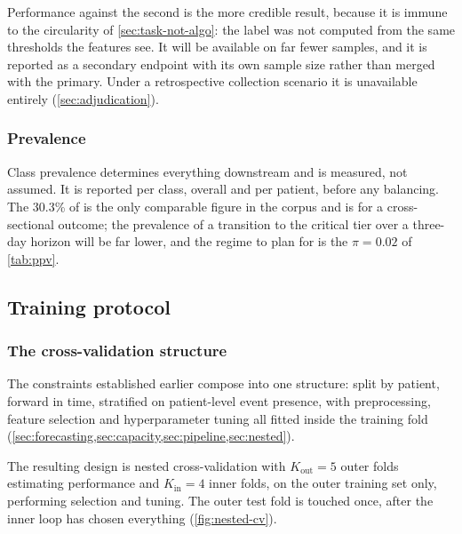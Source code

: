 \documentclass[12pt,a4paper,oneside]{report}
\begin{document}
Performance against the second is the more credible result, because it is immune to the circularity of \cref{sec:task-not-algo}: the label was not computed from the same thresholds the features see. It will be available on far fewer samples, and it is reported as a secondary endpoint with its own sample size rather than merged with the primary. Under a retrospective collection scenario it is unavailable entirely (\cref{sec:adjudication}).

\subsubsection{Prevalence}

Class prevalence determines everything downstream and is measured, not assumed. It is reported per class, overall and per patient, before any balancing. The 30.3\% of \textcite{mendoza2025} is the only comparable figure in the corpus and is for a cross-sectional outcome; the prevalence of a transition to the critical tier over a three-day horizon will be far lower, and the regime to plan for is the $\pi = 0.02$ of \cref{tab:ppv}.

\subsection{Training protocol}\label{sec:training}

\subsubsection{The cross-validation structure}\label{sec:cv-structure}

The constraints established earlier compose into one structure: split by patient, forward in time, stratified on patient-level event presence, with preprocessing, feature selection and hyperparameter tuning all fitted inside the training fold (\cref{sec:forecasting,sec:capacity,sec:pipeline,sec:nested}).

The resulting design is nested cross-validation with $K_{\text{out}} = 5$ outer folds estimating performance and $K_{\text{in}} = 4$ inner folds, on the outer training set only, performing selection and tuning. The outer test fold is touched once, after the inner loop has chosen everything (\cref{fig:nested-cv}).
\end{document}
